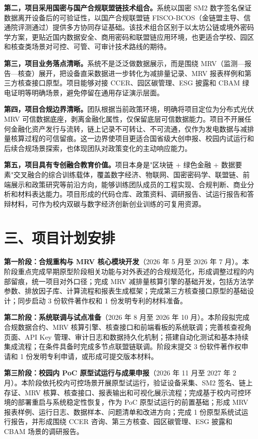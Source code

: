 \documentclass[12pt,a4paper]{article}
\begin{document}
\textbf{第二，项目采用国密与国产合规联盟链技术组合。}系统以国密 SM2 数字签名保证数据离开设备后的可验证性，以国产合规联盟链 FISCO-BCOS（金链盟主导、信通院评测通过）提供多方协同存证基础。该技术组合区别于以太坊公链或境外密码学方案，更贴近国内数据安全、商用密码和联盟链应用环境，也更适合学校、园区和核查类场景对可控、可管、可审计技术路线的期待。

\textbf{第三，项目业务落点清晰。}系统不是泛泛做数据展示，而是围绕 MRV（监测—报告—核查）展开，把设备直采数据进一步转化为减排量记录、MRV 报表样例和第三方核查接口原型。项目能够对接 CCER、园区碳管理、ESG 披露和 CBAM 绿电证明等明确场景，避免停留在通用存证演示层面。

\textbf{第四，项目合规边界清晰。}团队根据当前政策环境，明确将项目定位为分布式光伏 MRV 可信数据底座，剥离金融化属性，仅保留底层可信数据能力。项目不开展任何金融化资产发行与流转，链上记录不可转让、不可流通，仅作为发电数据与减排量核算过程的可信留痕。这一边界使项目更适合国省级大创申报、校园内试运行和后续合规场景探索，也体现团队对政策变化的主动响应能力。

\textbf{第五，项目具有专创融合教育价值。}项目本身是"区块链 + 绿色金融 + 数据要素"交叉融合的综合训练载体，覆盖数字经济、物联网、国密密码学、联盟链、前端展示和政策研究等前沿方向，能够训练团队成员的工程实现、合规判断、商业分析和材料表达能力。项目形成的代码仓库、政策资料、调研报告、试运行报告和答辩材料，可作为校内双碳与数字经济创新创业训练的可复用资源。


\newpage
\section*{三、项目计划安排}

\textbf{第一阶段：合规重构与 MRV 核心模块开发}（2026 年 5 月至 2026 年 7 月）。本阶段重点完成早期原型阶段相关功能与对外表述的合规规范化，形成调整过程的内部留痕，统一项目对外口径；完成 MRV 减排量核算引擎的基础开发，包括方法学参数、排放因子库、计算流程和报表生成框架；完成第三方核查接口原型的基础设计；同步启动 3 份软件著作权和 1 份发明专利的材料准备。

\textbf{第二阶段：系统联调与试点准备}（2026 年 8 月至 2026 年 10 月）。本阶段拟完成合规数据合约、MRV 核算引擎、核查接口和前端看板的系统联调；完善核查视角页面、API Key 管理、审计日志和数据持久化机制；搭建自动化测试和基本持续集成流程；在条件具备时完成多节点联盟链联调。阶段末提交 3 份软件著作权申请和 1 份发明专利申请，或形成可提交版本材料。

\textbf{第三阶段：校园内 PoC 原型试运行与成果申报}（2026 年 11 月至 2027 年 2 月）。本阶段依托校内可控场景开展原型试运行，验证设备采集、SM2 签名、链上存证、MRV 核算、核查接口、报表输出和可视化展示流程；完成基于校内可控环境的部署重启与系统稳定性恢复，作为 PoC 原型试运行的前置基础；形成 MRV 报表样例、运行日志、数据样本、问题清单和改进方向；完成 1 份原型系统试运行报告，并形成围绕 CCER 咨询、第三方核查、园区碳管理、ESG 披露和 CBAM 场景的调研报告。
\end{document}
